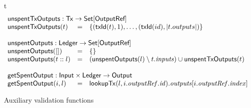 \begin{ruledfigure}{t}
  \begin{displaymath}
  \begin{array}{lll}
  \multicolumn{3}{l}{\txunspent : \utxotx \rightarrow \Set{\s{OutputRef}}}\\
  \txunspent(t) &=& \{(\txId(t),1), \ldots, (\txId(id),\left|t.outputs\right|)\}\\
  \\
  \multicolumn{3}{l}{\unspent : \s{Ledger} \rightarrow \Set{\s{OutputRef}}}\\
  \unspent([]) &=& \emptymap \\
  \unspent(t::l) &=& (\unspent(l) \setminus t.\inputs) \cup \txunspent(t)\\
  \\
  \multicolumn{3}{l}{\getSpent : \s{Input} \times \s{Ledger} \rightarrow \s{Output}}\\
  \getSpent(i,l) &=& \lookupTx(l, i.\outputref.\id).\outputs[i.\outputref.\idx]
  \end{array}
  \end{displaymath}
  \caption{Auxiliary validation functions}
  \label{fig:validation-functions}
\end{ruledfigure}
%
